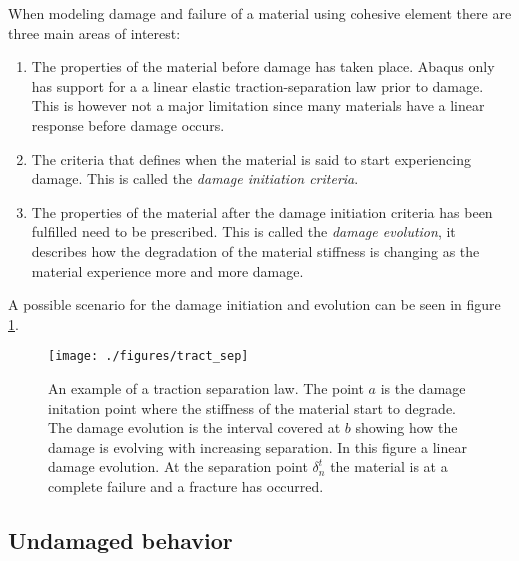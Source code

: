\documentclass[grain_boundary_law.tex]{subfiles}
\begin{document}
When modeling damage and failure of a material using cohesive element there are three main areas of interest:

\begin{enumerate}
\item The properties of the material before damage has taken place. Abaqus only has support for a a linear elastic traction-separation law prior to damage. This is however not a major limitation since many materials have a linear response before damage occurs. 

\item The criteria that defines when the material is said to start experiencing damage. This is called the \textit{damage initiation criteria}.

\item The properties of the material after the damage initiation criteria has been fulfilled need to be prescribed. This is called the \textit{damage evolution}, it describes how the degradation of the material stiffness is changing as the material experience more and more damage.
\end{enumerate}
%
A possible scenario for the damage initiation and evolution can be seen in figure \ref{fig:tract_sep}.

\begin{figure}
\centering
  \texttt{[image: ./figures/tract\_sep]}
\caption{An example of a traction separation law. The point $a$ is the damage initation point where the stiffness of the material start to degrade. The damage evolution is the interval covered at $b$ showing how the damage is evolving with increasing separation. In this figure a linear damage evolution. At the separation point $\delta_n^t$ the material is at a complete failure and a fracture has occurred.}
\label{fig:tract_sep}
\end{figure}

\subsection{Undamaged behavior}
 
\end{document}
